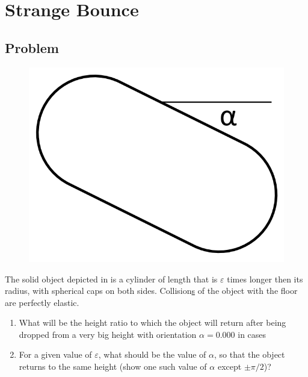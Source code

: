 \section*{Strange Bounce}

\subsection*{Problem}

\begin{figure}
    \centering
    \vspace{-.75cm}
    \includegraphics[width = \textwidth / 4]{P-1}
    \caption{}
    \vspace{-1cm}
\end{figure}
The solid object depicted in  is a cylinder of length
that is $\varepsilon$ times longer then its radius,
with spherical caps on both sides.
Collision\underline{s} of the object with the floor are perfectly elastic.

\begin{enumerate}
    
\item What will be the height ratio to which the object will return
after being dropped from a very big height with orientation $\alpha=0.000$
in cases


\item For a given value of $\varepsilon$,
    what should be the value of $\alpha$,
    so that the object returns to the same height
    (show one such value of $\alpha$ except $\pm \pi/2$)?
\end{enumerate}

